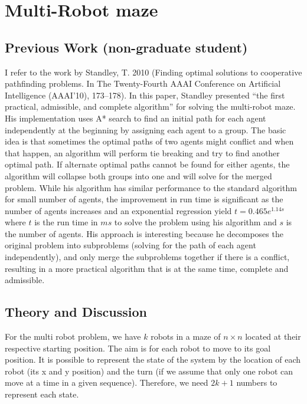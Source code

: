 \documentclass[9.5pt]{extarticle}
\begin{document}
\section{Multi-Robot maze}

\subsection{Previous Work (non-graduate student)}

I refer to the work by Standley, T. 2010 (Finding optimal solutions to cooperative pathfinding problems. In The Twenty-Fourth AAAI Conference on Artificial Intelligence (AAAI’10), 173–178). In this paper, Standley presented ``the first practical, admissible, and complete algorithm'' for solving the multi-robot maze. His implementation uses A* search to find an initial path for each agent independently at the beginning by assigning each agent to a group. The basic idea is that sometimes the optimal paths of two agents might conflict and when that happen, an algorithm will perform tie breaking and try to find another optimal path. If alternate optimal paths cannot be found for either agents, the algorithm will collapse both groups into one and will solve for the merged problem. While his algorithm has similar performance to the standard algorithm for small number of agents, the improvement in run time is significant as the number of agents increases and an exponential regression yield $t = 0.465e^{1.14s}$ where $t$ is the run time in $ms$ to solve the problem using his algorithm and $s$ is the number of agents. His approach is interesting because he decomposes the original problem into subproblems (solving for the path of each agent independently), and only merge the subproblems together if there is a conflict, resulting in a more practical algorithm that is at the same time, complete and admissible.

\subsection{Theory and Discussion}

For the multi robot problem, we have $k$ robots in a maze of $n\times n$ located at their respective starting position. The aim is for each robot to move to its goal position. It is possible to represent the state of the system by the location of each robot (its x and y position) and the turn (if we assume that only one robot can move at a time in a given sequence). Therefore, we need $2k + 1$ numbers to represent each state.\\
\end{document}
